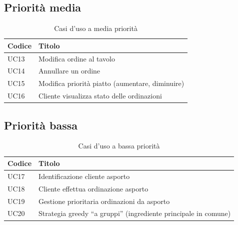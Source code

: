 \subsection{Priorità media}
\begin{table}[htbp]
	\centering
	\begin{tabularx}{\textwidth}{|>{\centering\arraybackslash} m{4em}| >{\raggedright\arraybackslash}X |}
		\hline
		\textbf{Codice} & \textbf{Titolo} \\ [0.5ex]
		\hline\hline
		UC13 & Modifica ordine al tavolo  \\
		\hline
		UC14 & Annullare un ordine \\
		\hline
		UC15 & Modifica priorità piatto (aumentare, diminuire) \\
		\hline
		UC16 & Cliente visualizza stato delle ordinazioni  \\
		\hline
	\end{tabularx}
	\caption{Casi d'uso a media priorità}
	\label{tab:use_cases_medium_priority}
\end{table}

\subsection{Priorità bassa}
\begin{table}[htbp]
	\centering
	\begin{tabularx}{\textwidth}{|>{\centering\arraybackslash} m{4em}| >{\raggedright\arraybackslash}X |}
		\hline
		\textbf{Codice} & \textbf{Titolo} \\ [0.5ex]
		\hline\hline
		UC17 & Identificazione cliente asporto  \\
		\hline
		UC18 & Cliente effettua ordinazione asporto  \\
		\hline
		UC19 & Gestione prioritaria ordinazioni da asporto \\
		\hline
		UC20 & Strategia greedy “a gruppi” (ingrediente principale in comune)   \\
		\hline
	\end{tabularx}
	\caption{Casi d'uso a bassa priorità}
	\label{tab:use_cases_low_priority}
\end{table}

\clearpage